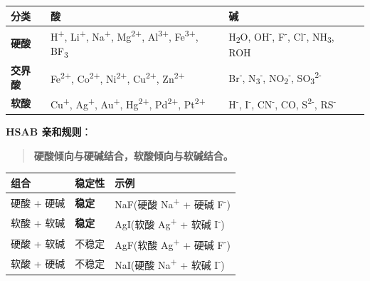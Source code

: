 {\def\LTcaptype{none} %
\begin{longtable}[]{@{}
  >{\raggedright\arraybackslash}p{}
  >{\raggedright\arraybackslash}p{}
  >{\raggedright\arraybackslash}p{}@{}}
\toprule\noalign{}
\begin{minipage}[b]{\linewidth}\raggedright
分类
\end{minipage} & \begin{minipage}[b]{\linewidth}\raggedright
酸
\end{minipage} & \begin{minipage}[b]{\linewidth}\raggedright
碱
\end{minipage} \\
\midrule\noalign{}
\endhead
\bottomrule\noalign{}
\endlastfoot
\textbf{硬酸} & H\textsuperscript{+}, Li\textsuperscript{+}, Na\textsuperscript{+}, Mg\textsuperscript{2+}, Al\textsuperscript{3+}, Fe\textsuperscript{3+}, BF\textsubscript{3} & H\textsubscript{2}O, OH\textsuperscript{-}, F\textsuperscript{-}, Cl\textsuperscript{-}, NH\textsubscript{3}, ROH \\
\textbf{交界酸} & Fe\textsuperscript{2+}, Co\textsuperscript{2+}, Ni\textsuperscript{2+}, Cu\textsuperscript{2+}, Zn\textsuperscript{2+} & Br\textsuperscript{-}, N\textsubscript{3}\textsuperscript{-}, NO\textsubscript{2}\textsuperscript{-}, SO\textsubscript{3}\textsuperscript{2-} \\
\textbf{软酸} & Cu\textsuperscript{+}, Ag\textsuperscript{+}, Au\textsuperscript{+}, Hg\textsuperscript{2+}, Pd\textsuperscript{2+}, Pt\textsuperscript{2+} & H\textsuperscript{-}, I\textsuperscript{-}, CN\textsuperscript{-}, CO, S\textsuperscript{2-}, RS\textsuperscript{-} \\
\end{longtable}
}

\textbf{HSAB 亲和规则}：

\begin{quote}
\textbf{硬酸倾向与硬碱结合，软酸倾向与软碱结合。}
\end{quote}

{\def\LTcaptype{none} %
\begin{longtable}[]{@{}lll@{}}
\toprule\noalign{}
组合 & 稳定性 & 示例 \\
\midrule\noalign{}
\endhead
\bottomrule\noalign{}
\endlastfoot
硬酸 + 硬碱 & \textbf{稳定} & NaF(硬酸 Na\textsuperscript{+} + 硬碱 F\textsuperscript{-}) \\
软酸 + 软碱 & \textbf{稳定} & AgI(软酸 Ag\textsuperscript{+} + 软碱 I\textsuperscript{-}) \\
硬酸 + 软碱 & 不稳定 & AgF(软酸 Ag\textsuperscript{+} + 硬碱 F\textsuperscript{-}) \\
软酸 + 硬碱 & 不稳定 & NaI(硬酸 Na\textsuperscript{+} + 软碱 I\textsuperscript{-}) \\
\end{longtable}
}

